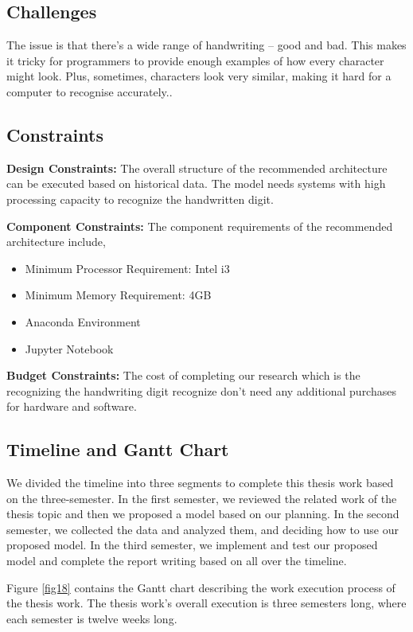 \subsection{Challenges}
The issue is that there's a wide range of handwriting – good and bad. This makes it tricky for programmers to provide enough examples of how every character might look. Plus, sometimes, characters look very similar, making it hard for a computer to recognise accurately..



\subsection{Constraints}

\textbf{Design Constraints: } The overall structure of the recommended architecture can be executed based on historical data. The model needs systems with high processing capacity to recognize the handwritten digit.

\textbf{Component Constraints: } The component requirements of the recommended architecture include,
\begin{itemize}
\item Minimum Processor Requirement:  Intel i3
\item Minimum Memory Requirement: 4GB 
\item Anaconda Environment
\item Jupyter Notebook
\end{itemize}


\textbf{Budget Constraints: }The cost of completing our research which is the recognizing the handwriting digit recognize  don't need any additional purchases for hardware and software.

\subsection{Timeline and Gantt Chart}
We divided the timeline into three segments to complete this thesis work based on the three-semester. In the first semester, we reviewed the related work of the thesis topic and then we proposed a model based on our planning. In the second semester, we collected the data and analyzed them, and deciding how to use our proposed model. In the third semester, we implement and test our proposed model and complete the report writing based on all over the timeline.

Figure \ref{fig18} contains the Gantt chart describing the work execution process of the thesis
work. The thesis work’s overall execution is three semesters long, where each semester
is twelve weeks long.

